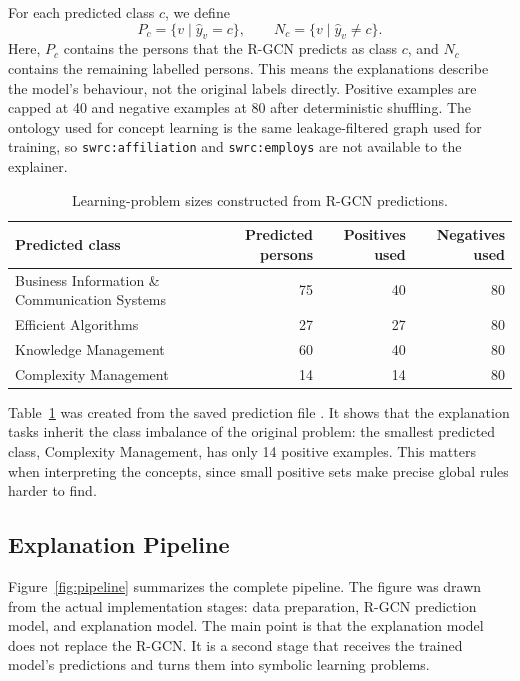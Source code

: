 \documentclass[runningheads]{llncs}
\begin{document}
For each predicted class $c$, we define
\[
P_c = \{v \mid \hat{y}_v = c\}, \qquad
N_c = \{v \mid \hat{y}_v \neq c\}.
\]
Here, $P_c$ contains the persons that the R-GCN predicts as class $c$, and $N_c$ contains the remaining
labelled persons.  This means the explanations describe the model's behaviour, not the original labels
directly.  Positive examples are capped at 40 and negative examples at 80 after deterministic shuffling.
The ontology used for concept learning is the same leakage-filtered graph used for training, so
\texttt{swrc:affiliation} and \texttt{swrc:employs} are not available to the explainer.

\begin{table}[ht]
\centering
\caption{Learning-problem sizes constructed from R-GCN predictions.}
\label{tab:learning-problems}
\small
\begin{tabularx}{\textwidth}{Xrrr}
\toprule
\textbf{Predicted class} & 
\textbf{Predicted persons} & 
\textbf{Positives used} & 
\textbf{Negatives used} \\
\midrule
Business Information \& Communication Systems & 75 & 40 & 80 \\
Efficient Algorithms                          & 27 & 27 & 80 \\
Knowledge Management                          & 60 & 40 & 80 \\
Complexity Management                         & 14 & 14 & 80 \\
\bottomrule
\end{tabularx}
\end{table}

Table~\ref{tab:learning-problems} was created from the saved prediction file
.
It shows that the explanation tasks inherit the class imbalance
of the original problem: the smallest predicted class, Complexity Management, has only 14 positive
examples.  This matters when interpreting the concepts, since small positive sets make precise global
rules harder to find.

\subsection{Explanation Pipeline}

Figure~\ref{fig:pipeline} summarizes the complete pipeline.  The figure was drawn from the actual
implementation stages: data preparation, R-GCN prediction model, and explanation model.  The main point is
that the explanation model does not replace the R-GCN.  It is a second stage that receives the trained
model's predictions and turns them into symbolic learning problems.
\end{document}
